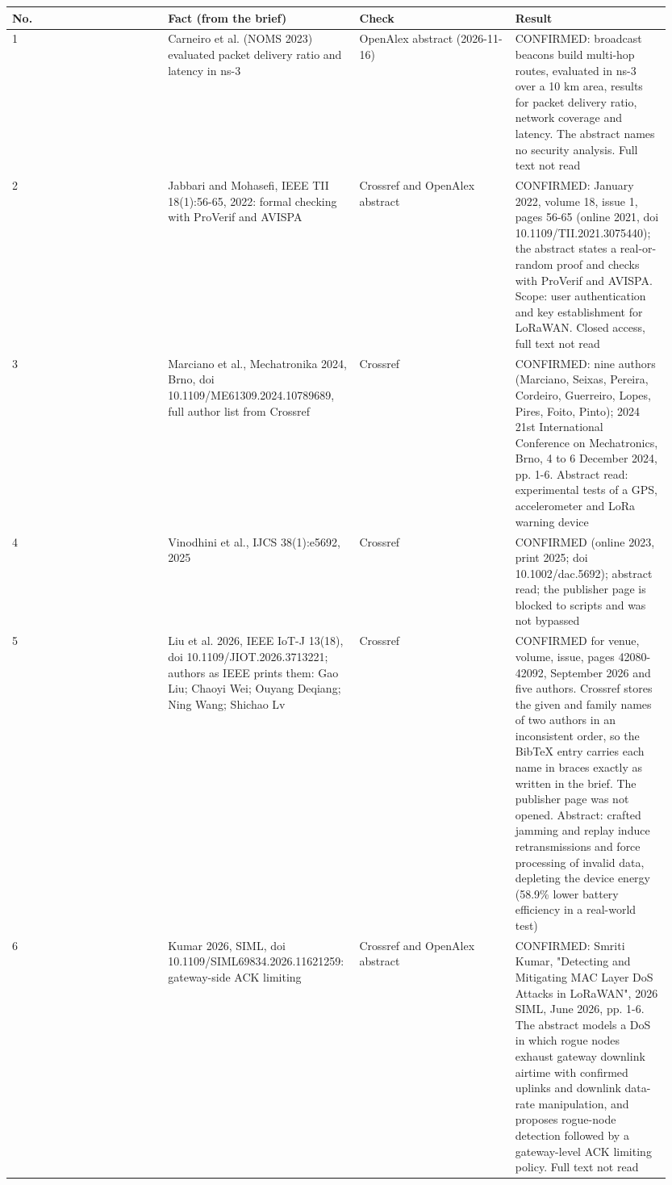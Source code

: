 {\scriptsize\raggedright
\begin{longtable}{p{0.237\linewidth}p{0.237\linewidth}p{0.237\linewidth}p{0.237\linewidth}}
\toprule
No. & Fact (from the brief) & Check & Result \\
\midrule
\endhead
1 & Carneiro et al. (NOMS 2023) evaluated packet delivery ratio and latency in ns-3 & OpenAlex abstract (2026-11-16) & CONFIRMED: broadcast beacons build multi-hop routes, evaluated in ns-3 over a 10 km area, results for packet delivery ratio, network coverage and latency. The abstract names no security analysis. Full text not read \\
2 & Jabbari and Mohasefi, IEEE TII 18(1):56-65, 2022: formal checking with ProVerif and AVISPA & Crossref and OpenAlex abstract & CONFIRMED: January 2022, volume 18, issue 1, pages 56-65 (online 2021, doi 10.1109/TII.2021.3075440); the abstract states a real-or-random proof and checks with ProVerif and AVISPA. Scope: user authentication and key establishment for LoRaWAN. Closed access, full text not read \\
3 & Marciano et al., Mechatronika 2024, Brno, doi 10.1109/ME61309.2024.10789689, full author list from Crossref & Crossref & CONFIRMED: nine authors (Marciano, Seixas, Pereira, Cordeiro, Guerreiro, Lopes, Pires, Foito, Pinto); 2024 21st International Conference on Mechatronics, Brno, 4 to 6 December 2024, pp. 1-6. Abstract read: experimental tests of a GPS, accelerometer and LoRa warning device \\
4 & Vinodhini et al., IJCS 38(1):e5692, 2025 & Crossref & CONFIRMED (online 2023, print 2025; doi 10.1002/dac.5692); abstract read; the publisher page is blocked to scripts and was not bypassed \\
5 & Liu et al. 2026, IEEE IoT-J 13(18), doi 10.1109/JIOT.2026.3713221; authors as IEEE prints them: Gao Liu; Chaoyi Wei; Ouyang Deqiang; Ning Wang; Shichao Lv & Crossref & CONFIRMED for venue, volume, issue, pages 42080-42092, September 2026 and five authors. Crossref stores the given and family names of two authors in an inconsistent order, so the BibTeX entry carries each name in braces exactly as written in the brief. The publisher page was not opened. Abstract: crafted jamming and replay induce retransmissions and force processing of invalid data, depleting the device energy (58.9\% lower battery efficiency in a real-world test) \\
6 & Kumar 2026, SIML, doi 10.1109/SIML69834.2026.11621259: gateway-side ACK limiting & Crossref and OpenAlex abstract & CONFIRMED: Smriti Kumar, "Detecting and Mitigating MAC Layer DoS Attacks in LoRaWAN", 2026 SIML, June 2026, pp. 1-6. The abstract models a DoS in which rogue nodes exhaust gateway downlink airtime with confirmed uplinks and downlink data-rate manipulation, and proposes rogue-node detection followed by a gateway-level ACK limiting policy. Full text not read \\

\end{longtable}}

